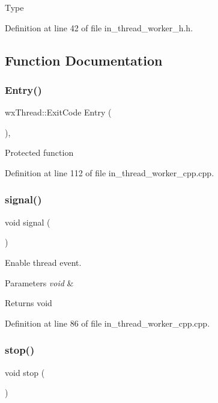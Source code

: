 Type 

Definition at line 42 of file in\+\_\+thread\+\_\+worker\+\_\+h.\+h.



\subsection{Function Documentation}
\mbox{\label{group___thread_gabb46e4f8cbf5cc2761c1764aa8850eda}} 
\subsubsection{Entry()}
{\footnotesize\ttfamily wx\+Thread\+::\+Exit\+Code Entry (\begin{DoxyParamCaption}{ }\end{DoxyParamCaption})\hspace{0.3cm}{\ttfamily [protected]}, {\ttfamily [virtual]}}

Protected function 

Definition at line 112 of file in\+\_\+thread\+\_\+worker\+\_\+cpp.\+cpp.

\mbox{\label{group___thread_ga9be40565c676939670f97a1fa1966c28}} 
\subsubsection{signal()}
{\footnotesize\ttfamily void signal (\begin{DoxyParamCaption}\item[{void}]{ }\end{DoxyParamCaption})}



Enable thread event. 


\begin{DoxyParams}{Parameters}
{\em void} & \\
\hline
\end{DoxyParams}
\begin{DoxyReturn}{Returns}
void 
\end{DoxyReturn}


Definition at line 86 of file in\+\_\+thread\+\_\+worker\+\_\+cpp.\+cpp.

\mbox{\label{group___thread_gaacf6bf8e121fea8b0a92d7197b73fe27}} 
\subsubsection{stop()}
{\footnotesize\ttfamily void stop (\begin{DoxyParamCaption}\item[{void}]{ }\end{DoxyParamCaption})}



